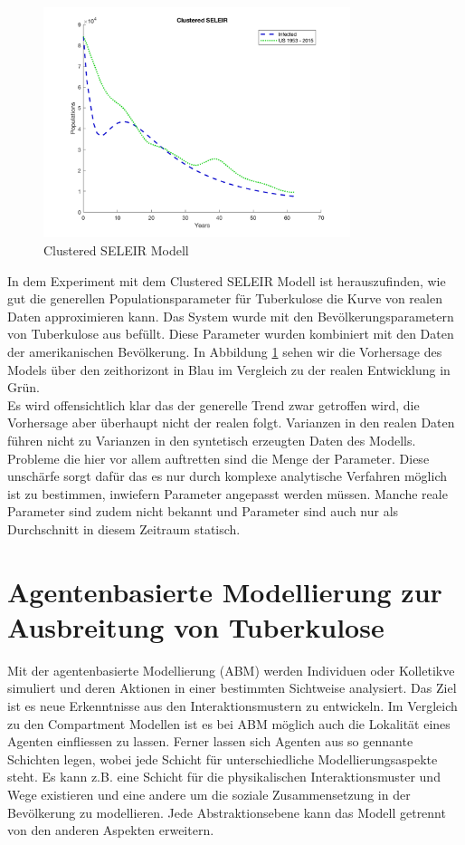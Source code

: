 \documentclass[paper=a4, fontsize=11pt, ngerman, abstract=on]{scrartcl}
\numberwithin{equation}{section} %
\numberwithin{figure}{section} %
\numberwithin{table}{section} %
\begin{document}
\begin{figure}[ht]
  \centering
  \includegraphics[width=0.8\textwidth,keepaspectratio]{images/clustered_seleir_against_us_data}
  \caption{Clustered SELEIR Modell}
  \label{fig:clustered-seleir-compare}
\end{figure}

In dem Experiment mit dem Clustered SELEIR Modell ist herauszufinden, wie gut die generellen Populationsparameter für Tuberkulose die Kurve von realen Daten approximieren kann. Das System wurde mit den Bevölkerungsparametern von Tuberkulose aus \cite{Trauer2014} befüllt. Diese Parameter wurden kombiniert mit den Daten der amerikanischen Bevölkerung. In Abbildung \ref{fig:clustered-seleir-compare} sehen wir die Vorhersage des Models über den zeithorizont in Blau im Vergleich zu der realen Entwicklung in Grün. \\

Es wird offensichtlich klar das der generelle Trend zwar getroffen wird, die Vorhersage aber überhaupt nicht der realen folgt. Varianzen in den realen Daten führen nicht zu Varianzen in den syntetisch erzeugten Daten des Modells. Probleme die hier vor allem auftretten sind die Menge der Parameter. Diese unschärfe sorgt dafür das es nur durch komplexe analytische Verfahren möglich ist zu bestimmen, inwiefern Parameter angepasst werden müssen. Manche reale Parameter sind zudem nicht bekannt und Parameter sind auch nur als Durchschnitt in diesem Zeitraum statisch.

\section{Agentenbasierte Modellierung zur Ausbreitung von Tuberkulose}

Mit der agentenbasierte Modellierung (ABM) werden Individuen oder Kolletikve simuliert und deren Aktionen in einer bestimmten Sichtweise analysiert. Das Ziel ist es neue Erkenntnisse aus den Interaktionsmustern zu entwickeln. Im Vergleich zu den Compartment Modellen ist es bei ABM möglich auch die Lokalität eines Agenten einfliessen zu lassen. Ferner lassen sich Agenten aus so gennante Schichten legen, wobei jede Schicht für unterschiedliche Modellierungsaspekte steht. Es kann z.B. eine Schicht für die physikalischen Interaktionsmuster und Wege existieren und eine andere um die soziale Zusammensetzung in der Bevölkerung zu modellieren. Jede Abstraktionsebene kann das Modell getrennt von den anderen Aspekten erweitern. \\
\end{document}
